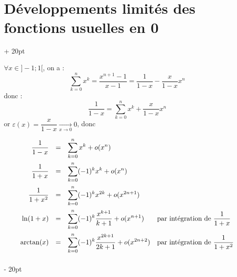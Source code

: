 \documentclass[a4paper, 12pt, twoside]{article}
\newcommand{\tendsto}[1]{\xrightarrow[#1]{}}
\newcommand{\ind}[1][20pt]{\advance\leftskip + #1}
\newcommand{\deind}[1][20pt]{\advance\leftskip - #1}
\newenvironment{indt}[2][20pt]{#2 \par \ind[#1]}{\par \deind} %
\begin{document}
    \vspace{12pt}
    
    \begin{indt}{\section{Développements limités des fonctions usuelles en 0}}
        
        $\forall x \in ]-1 ; 1[$, on a :
            \[ \sum_{k = 0}^n x^k = \dfrac{x^{n + 1} - 1}{x - 1} = \dfrac{1}{1 - x} - \dfrac{x}{1 - x}x^n \]
        donc :
            \[ \dfrac{1}{1 - x} = \sum_{k = 0}^n x^k + \dfrac{x}{1 - x} x^n \]
        or $\varepsilon(x) = \dfrac{x}{1 - x} \tendsto{x \to 0} 0$, donc
%         
%         
%         
        
        \[
            \begin{array}{rcll}
                \dfrac{1}{1 - x} &=& \displaystyle \sum_{k = 0}^n x^k + o(x^n)
                \vspace{5pt}
                \\
                \dfrac{1}{1 + x} &=& \displaystyle \sum_{k = 0}^n (-1)^k x^k + o(x^n)
                \vspace{5pt}
                \\
                \dfrac{1}{1 + x^2} &=& \displaystyle \sum_{k = 0}^n (-1)^k x^{2k} + o(x^{2n + 1})
                \vspace{5pt}
                \\
                \ln(1 + x) &=& \displaystyle \sum_{k = 0}^n (-1)^k \dfrac{x^{k + 1}}{k + 1} + o(x^{n + 1})
                & \text{par intégration de $\dfrac{1}{1 + x}$}
                \vspace{5pt}
                \\
                \arctan(x) &=& \displaystyle \sum_{k = 0}^n (-1)^k \dfrac{x^{2k + 1}}{2k + 1} + o(x^{2n + 2})
                & \text{par intégration de $\dfrac{1}{1 + x^2}$}
                \vspace{5pt}
                \\
            \end{array}
        \]
        

\end{indt}
\end{document}
